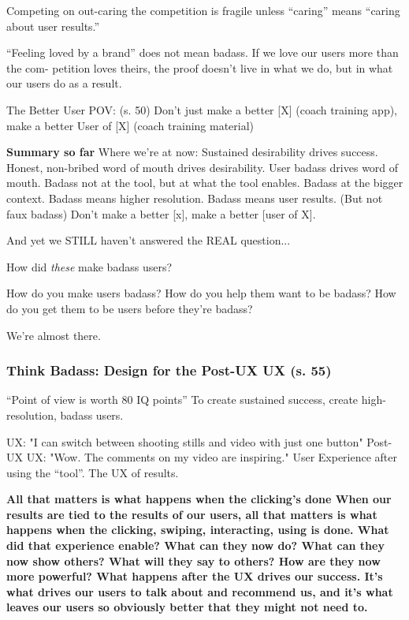 Competing on out-caring the competition is fragile unless “caring” means “caring about user results.”

“Feeling loved by a brand” does not mean badass. If we love
our users more than the com- petition loves theirs, the proof doesn’t live in what we do, but in what our users do as a result.

The Better User POV: (s. 50)
Don’t just make a better [X] (coach training app),
make a better User of [X] (coach training material)

\textbf{Summary so far}
Where we’re at now:
Sustained desirability drives success.
Honest, non-bribed word of mouth drives desirability. User badass drives word of mouth.
Badass not at the tool, but at what the tool enables. Badass at the bigger context.
Badass means higher resolution.
Badass means user results.
(But not faux badass)
Don’t make a better [x], make a better [user of X].

And yet we STILL haven’t answered the REAL question...

How did \textit{these} make badass users?

How do you make users badass?
How do you help them want to be badass?
How do you get them to be users before they’re badass?

We're almost there.

\subsubsection{Think Badass: Design for the Post-UX UX (s. 55)}
“Point of view is worth 80 IQ points”
To create sustained success, create high-resolution, badass users.

UX: "I  can switch between shooting stills and video with just one button"
Post-UX UX: "Wow. The comments on my video are inspiring." User Experience after using the “tool”.
The UX of results.

\textbf{All that matters is what happens when the clicking’s done
When our results are tied to the results of our users, all that matters is what happens when the clicking, swiping, interacting, using is done.
What did that experience enable? What can they now do?
What can they now show others? What will they say to others?
How are they now more powerful?
What happens after the UX drives our success. It’s what drives our users to talk about and recommend us, and it’s what leaves our users so obviously better that they might not need to.}

